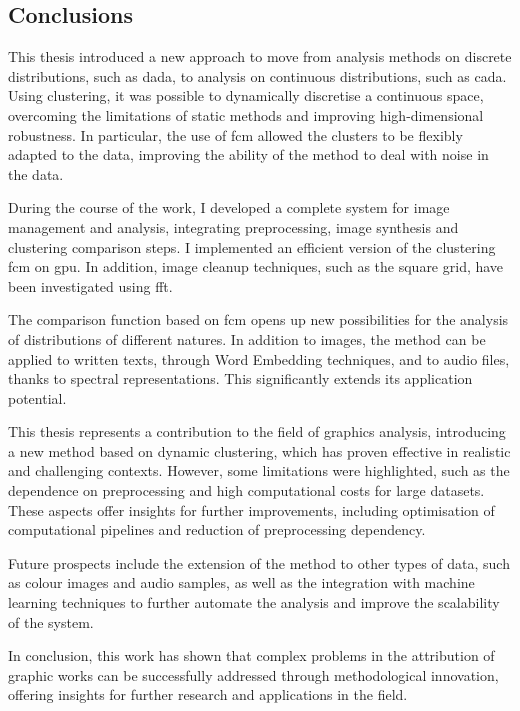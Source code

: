 \begin{toReview}
\section{Conclusions}
This thesis introduced a new approach to move from analysis methods on discrete distributions, such as \gls{dada}, to analysis on continuous distributions, such as \gls{cada}. Using clustering, it was possible to dynamically discretise a continuous space, overcoming the limitations of static methods and improving high-dimensional robustness. In particular, the use of \gls{fcm} allowed the clusters to be flexibly adapted to the data, improving the ability of the method to deal with noise in the data.

\noindent During the course of the work, I developed a complete system for image management and analysis, integrating preprocessing, image synthesis and clustering comparison steps. I implemented an efficient version of the clustering \gls{fcm} on \gls{gpu}. In addition, image cleanup techniques, such as the square grid, have been investigated using \gls{fft}.

\noindent The comparison function based on \gls{fcm} opens up new possibilities for the analysis of distributions of different natures. In addition to images, the method can be applied to written texts, through Word Embedding techniques, and to audio files, thanks to spectral representations. This significantly extends its application potential.

\bigskip \noindent This thesis represents a contribution to the field of graphics analysis, introducing a new method based on dynamic clustering, which has proven effective in realistic and challenging contexts. However, some limitations were highlighted, such as the dependence on preprocessing and high computational costs for large datasets. These aspects offer insights for further improvements, including optimisation of computational pipelines and reduction of preprocessing dependency.

\noindent Future prospects include the extension of the method to other types of data, such as colour images and audio samples, as well as the integration with machine learning techniques to further automate the analysis and improve the scalability of the system.

\bigskip \noindent In conclusion, this work has shown that complex problems in the attribution of graphic works can be successfully addressed through methodological innovation, offering insights for further research and applications in the field.
\end{toReview}

